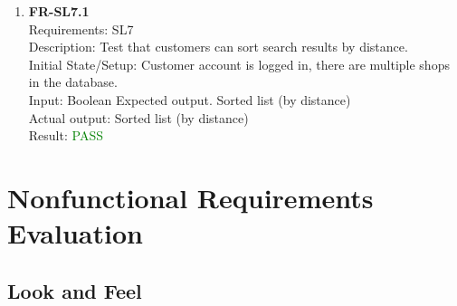 \documentclass[12pt, titlepage]{article}
\newcommand{\testpass}{\textcolor{green}{PASS}}
\begin{document}
\begin{enumerate}
                \item \textbf{FR-SL7.1} \label{FR-SL7.1} \\ Requirements: SL7 \\
                    Description: Test that customers can sort search results by distance. \\
                    Initial State/Setup: Customer account is logged in, there are multiple shops in the database. \\
                    Input: Boolean
                    Expected output. Sorted list (by distance)\\
                    Actual output: Sorted list (by distance)\\
                    Result: \testpass
                    \end{enumerate}

                    
\newpage

\section{Nonfunctional Requirements Evaluation}

\subsection{Look and Feel}
\end{document}
